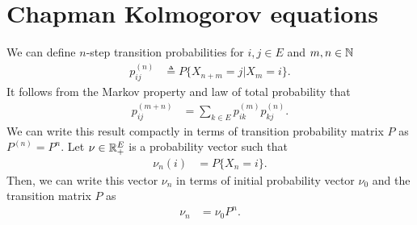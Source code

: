 \documentclass[a4paper,10pt,english]{article}
\begin{document}
\section{Chapman Kolmogorov equations}
We can define $n$-step transition probabilities for $i,j \in E$ and $m,n \in \mathbb{N}$
\begin{align*}
p_{ij}^{(n)} &\triangleq P\{X_{n+m} = j | X_m = i\}. 
\end{align*}
It follows from the Markov property and law of total probability that 
\begin{align*} 
p_{ij}^{(m+n)} &= \sum_{k \in E} p_{ik}^{(m)}p_{kj}^{(n)}.
\end{align*}
We can write this result compactly in terms of transition probability matrix $P$ as $P^{(n)} = P^n$. 
Let $\nu \in \mathbb{R}_+^E$ is a probability vector such that 
\begin{align*}
\nu_n(i) &= P\{X_n = i\}.
\end{align*}
Then, we can write this vector $\nu_n$ in terms of initial probability vector $\nu_0$ and the transition matrix $P$ as 
\begin{align*}
\nu_n &= \nu_0P^n.
\end{align*}

 
\end{document}
